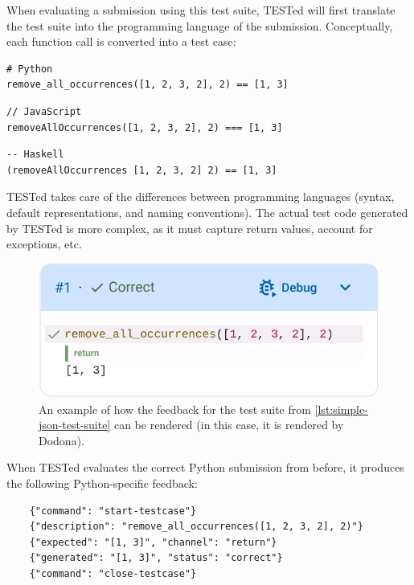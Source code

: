 \documentclass[../main]{subfiles}
\begin{document}
When evaluating a submission using this test suite, TESTed will first translate the test suite into the programming language of the submission.
Conceptually, each function call is converted into a test case:

\begin{verbatim}
# Python
remove_all_occurrences([1, 2, 3, 2], 2) == [1, 3]
\end{verbatim}

\begin{verbatim}
// JavaScript
removeAllOccurrences([1, 2, 3, 2], 2) === [1, 3]
\end{verbatim}

\begin{verbatim}
-- Haskell
(removeAllOccurrences [1, 2, 3, 2] 2) == [1, 3]
\end{verbatim}

TESTed takes care of the differences between programming languages (syntax, default representations, and naming conventions).
The actual test code generated by TESTed is more complex, as it must capture return values, account for exceptions, etc.

\begin{figure}
    \centering
    \includegraphics[width=0.7\linewidth]{dodona-rendering-small}
    \caption{An example of how the feedback for the test suite from \cref{lst:simple-json-test-suite} can be rendered (in this case, it is rendered by Dodona).}
    \label{fig:dodona-rendering-small}
\end{figure}

\begin{samepage}
    When TESTed evaluates the correct Python submission from before, it produces the following Python-specific feedback:

    \begin{verbatim}
    {"command": "start-testcase"}
    {"description": "remove_all_occurrences([1, 2, 3, 2], 2)"}
    {"expected": "[1, 3]", "channel": "return"}
    {"generated": "[1, 3]", "status": "correct"}
    {"command": "close-testcase"}
    \end{verbatim}
\end{samepage}
\end{document}
